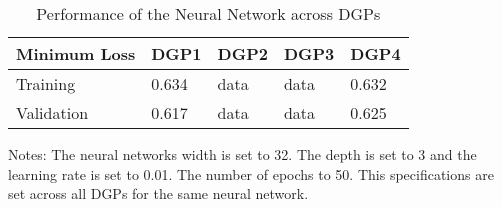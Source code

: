 

\begin{table}[]
\centering
\begin{threeparttable}
\caption{Performance of the Neural Network across DGPs}
\label{tab:table3}
\begin{tabular}{@{}lllll@{}}
\toprule
\addlinespace
Minimum Loss                & DGP1 & DGP2 & DGP3 & DGP4 \\ \midrule
Training    & 0.634 & data & data & 0.632 \\
Validation  & 0.617 & data & data & 0.625 \\ \bottomrule
\end{tabular}
\begin{tablenotes}
    \item Notes: The neural networks width is set to 32. The depth is set to 3 and the learning rate is set to 0.01. The number of epochs to 50. This specifications are set across all DGPs for the same neural network.
\end{tablenotes}
\end{threeparttable}
\end{table}
